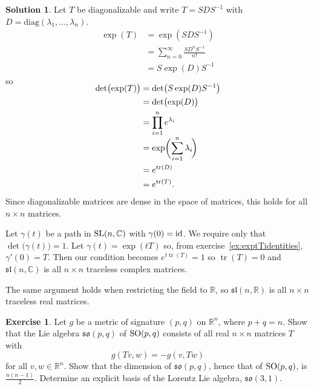 \documentclass[11pt, a4paper]{report}
\theoremstyle{definition}
\newtheorem{ex}{Exercise}[part]
\newtheorem{sol}{Solution}[part]
\newcommand*{\SL}{\ensuremath\text{SL}}
\newcommand*{\SO}{\ensuremath\text{SO}}
\DeclareMathOperator{\tr}{tr}
\newcommand*{\id}{\ensuremath\mathop{}\mathopen{}\mathrm{id}}
\begin{document}
\begin{sol}

Let $T$ be diagonalizable and write $T = SDS^{-1}$ with $D = \mathrm{diag}(\lambda_1, \ldots, \lambda_n)$.
\begin{align*}
    \exp(T) &= \exp(SDS^{-1}) \\
            &= \sum_{n = 0}^\infty \frac{S D^n S^{-1}}{n!} \\
            &= S \exp(D) S^{-1}
\end{align*}
so
\begin{align*}
    \SwapAboveDisplaySkip
    \det\bigl(\exp(T)\bigr) &= \det\bigl(S \exp(D) S^{-1} \bigr) \\
        &= \det\bigl(\exp(D)\bigr) \\
        &= \prod_{i = 1}^n e^{\lambda_i} \\[-1\jot]
        &= \exp \biggl(\sum_{i = 1}^n \lambda_i \! \biggr) \\
        &= e^{\tr(D)} \\
        &= e^{\tr(T)}.
\end{align*}
Since diagonalizable matrices are dense in the space of matrices, this holds for all $n \times n$ matrices.

Let $\gamma(t)$ be a path in $\SL(n, \mathbb{C})$ with $\gamma(0) = \id$. We require only that $\det\bigl(\gamma(t)\bigr) = 1$.
Let $\gamma(t) = \exp(tT)$ so, from exercise~\ref{ex:exptTidentities}, $\gamma'(0) = T$. Then our condition becomes $e^{t \tr(T)} = 1$ so $\tr(T) = 0$ and $\mathfrak{sl}(n, \mathbb{C})$ is all $n \times n$ traceless complex matrices.

The same argument holds when restricting the field to $\mathbb{R}$, so $\mathfrak{sl}(n, \mathbb{R})$ is all $n \times n$ traceless real matrices.

\end{sol}

\begin{ex}

Let $g$ be a metric of signature $(p, q)$ on $\mathbb{R}^n$, where $p + q = n$.
Show that the Lie algebra $\mathfrak{so}(p, q)$ of $\SO(p, q)$ consists of all real $n \times n$ matrices $T$ with
\[
    g(Tv, w) = -g(v, Tw)
\]
for all $v, w \in \mathbb{R}^n$.
Show that the dimension of $\mathfrak{so}(p, q)$, hence that of $\SO(p, q)$, is $\frac{n(n - 1)}{2}$.
Determine an explicit basis of the Lorentz Lie algebra, $\mathfrak{so}(3, 1)$.

\end{ex}
\end{document}

